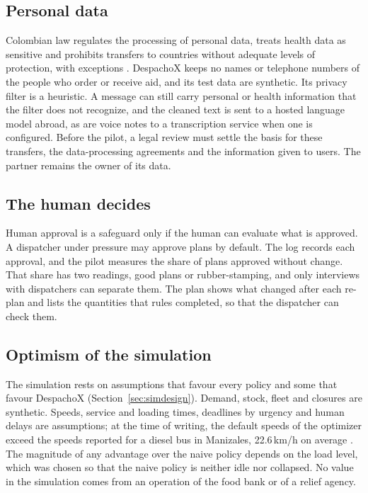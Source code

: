 \documentclass[11pt]{article}
\begin{document}
\subsection{Personal data}

Colombian law regulates the processing of personal data, treats health data as sensitive and prohibits transfers to countries without adequate levels of protection, with exceptions \citep{ley1581}. DespachoX keeps no names or telephone numbers of the people who order or receive aid, and its test data are synthetic. Its privacy filter is a heuristic. A message can still carry personal or health information that the filter does not recognize, and the cleaned text is sent to a hosted language model abroad, as are voice notes to a transcription service when one is configured. Before the pilot, a legal review must settle the basis for these transfers, the data-processing agreements and the information given to users. The partner remains the owner of its data.

\subsection{The human decides}

Human approval is a safeguard only if the human can evaluate what is approved. A dispatcher under pressure may approve plans by default. The log records each approval, and the pilot measures the share of plans approved without change. That share has two readings, good plans or rubber-stamping, and only interviews with dispatchers can separate them. The plan shows what changed after each re-plan and lists the quantities that rules completed, so that the dispatcher can check them.

\subsection{Optimism of the simulation}

The simulation rests on assumptions that favour every policy and some that favour DespachoX (Section~\ref{sec:simdesign}). Demand, stock, fleet and closures are synthetic. Speeds, service and loading times, deadlines by urgency and human delays are assumptions; at the time of writing, the default speeds of the optimizer exceed the speeds reported for a diesel bus in Manizales, 22.6\,km/h on average \citep{ocampo2019costos}. The magnitude of any advantage over the naive policy depends on the load level, which was chosen so that the naive policy is neither idle nor collapsed. No value in the simulation comes from an operation of the food bank or of a relief agency.
\end{document}
